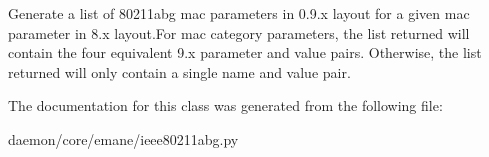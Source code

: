 \begin{DoxyVerb}Generate a list of 80211abg mac parameters in 0.9.x layout for a given mac parameter
in 8.x layout.For mac category parameters, the list returned will contain the four 
equivalent 9.x parameter and value pairs. Otherwise, the list returned will only
contain a single name and value pair.
\end{DoxyVerb}
 

The documentation for this class was generated from the following file\+:\begin{DoxyCompactItemize}
\item 
daemon/core/emane/ieee80211abg.\+py\end{DoxyCompactItemize}

